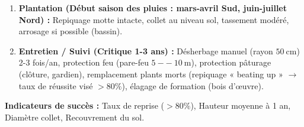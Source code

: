 \documentclass[11pt]{article}
\begin{document}
\begin{methode}
\begin{enumerate}
        \item \textbf{Plantation (Début saison des pluies : mars-avril Sud, juin-juillet Nord) :} Repiquage motte intacte, collet au niveau sol, tassement modéré, arrosage si possible (bassin).
        \item \textbf{Entretien / Suivi (Critique 1-3 ans) :} Désherbage manuel (rayon $\SI{50}{\cm}$) 2-3 fois/an, protection feu (pare-feu $\SI{5}{--}\SI{10}{\m}$), protection pâturage (clôture, gardien), remplacement plants morts (repiquage « beating up » $\rightarrow$ taux de réussite visé $> 80\%$), élagage de formation (bois d'œuvre).
    \end{enumerate}
    \textbf{Indicateurs de succès :} Taux de reprise ($> 80\%$), Hauteur moyenne à 1 an, Diamètre collet, Recouvrement du sol.
\end{methode}
\end{document}
